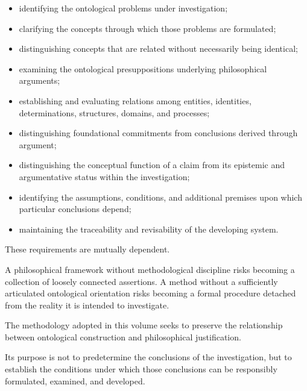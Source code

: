 \begin{itemize}

    \item identifying the ontological problems under
    investigation;

    \item clarifying the concepts through which those
    problems are formulated;

    \item distinguishing concepts that are related
    without necessarily being identical;

    \item examining the ontological presuppositions
    underlying philosophical arguments;

    \item establishing and evaluating relations among
    entities, identities, determinations, structures,
    domains, and processes;

    \item distinguishing foundational commitments
    from conclusions derived through argument;

    \item distinguishing the conceptual function
    of a claim from its epistemic and argumentative
    status within the investigation;

    \item identifying the assumptions, conditions,
    and additional premises upon which particular
    conclusions depend;

    \item maintaining the traceability and revisability
    of the developing system.

\end{itemize}

These requirements are mutually dependent.

A philosophical framework without methodological
discipline risks becoming a collection of loosely
connected assertions. A method without a sufficiently
articulated ontological orientation risks becoming
a formal procedure detached from the reality
it is intended to investigate.

The methodology adopted in this volume seeks
to preserve the relationship between ontological
construction and philosophical justification.

Its purpose is not to predetermine the conclusions
of the investigation, but to establish the conditions
under which those conclusions can be responsibly
formulated, examined, and developed.

